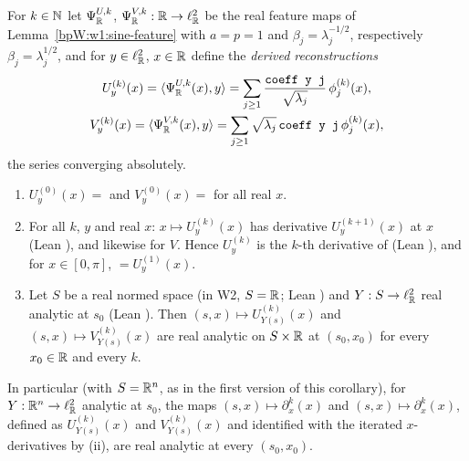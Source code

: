 \begin{corollary}\label{bpW:w1:recon-analytic}
For $k\in\mathbb{N}$ let $\Psi^{U,k}_{\mathbb{R}}$, $\Psi^{V,k}_{\mathbb{R}}:\mathbb{R}\to\ell^2_{\mathbb{R}}$ be the real feature maps of
Lemma~\ref{bpW:w1:sine-feature} with $a=p=1$ and $\beta_j=\lambda_j^{-1/2}$, respectively $\beta_j=\lambda_j^{1/2}$,
and for $y\in\ell^2_{\mathbb{R}}$, $x\in\mathbb{R}$ define the \emph{derived reconstructions}
\begin{gather*}U^{(k)}_y(x)=\langle\Psi^{U,k}_{\mathbb{R}}(x),y\rangle=\sum_{j\ge1}\frac{\texttt{coeff y j}}{\sqrt{\lambda_j}}\,\phi_j^{(k)}(x),\\
V^{(k)}_y(x)=\langle\Psi^{V,k}_{\mathbb{R}}(x),y\rangle=\sum_{j\ge1}\sqrt{\lambda_j}\,\texttt{coeff y j}\,\phi_j^{(k)}(x),\end{gather*}
the series converging absolutely.
\begin{enumerate}[label=(\roman*)]
\item $U^{(0)}_y(x)=$  and $V^{(0)}_y(x)=$  for all real $x$.
\item For all $k$, $y$ and real $x$: $x\mapsto U^{(k)}_y(x)$ has derivative $U^{(k+1)}_y(x)$ at $x$ (Lean
  ), and likewise for $V$. Hence $U^{(k)}_y$ is the $k$-th derivative of 
  (Lean ), and for $x\in[0,\pi]$,
   $=U^{(1)}_y(x)$.
\item Let $S$ be a real normed space (in W2, $S=\mathbb{R}$; Lean ) and
  $Y:S\to\ell^2_{\mathbb{R}}$ real analytic at $s_0$ (Lean ). Then
  $(s,x)\mapsto U^{(k)}_{Y(s)}(x)$ and $(s,x)\mapsto V^{(k)}_{Y(s)}(x)$ are real analytic on $S\times\mathbb{R}$ at
  $(s_0,x_0)$ for every $x_0\in\mathbb{R}$ and every $k$.
\end{enumerate}
In particular (with $S=\mathbb{R}^n$, as in the first version of this corollary), for $Y:\mathbb{R}^n\to\ell^2_{\mathbb{R}}$ analytic at $s_0$,
the maps $(s,x)\mapsto\partial_x^k$$(x)$ and $(s,x)\mapsto\partial_x^k$$(x)$,
defined as $U^{(k)}_{Y(s)}(x)$ and $V^{(k)}_{Y(s)}(x)$ and identified with the iterated $x$-derivatives by (ii), are real
analytic at every $(s_0,x_0)$.
\end{corollary}

